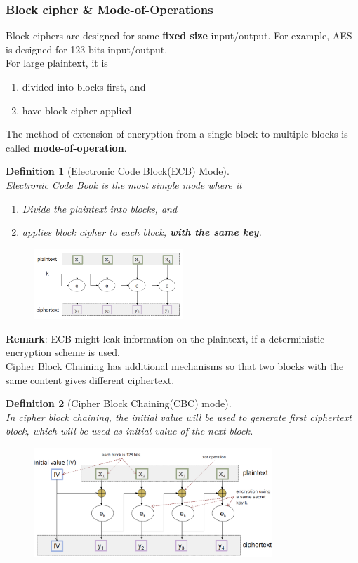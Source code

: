 \documentclass[12pt]{article}
\newtheorem{definition}{Definition}[section]
\theoremstyle{definition}
\begin{document}
\subsubsection{Block cipher \& Mode-of-Operations}
Block ciphers are designed for some \textbf{fixed size} input/output. For example, AES is designed for 123 bits input/output.\\
For large plaintext, it is 
\begin{enumerate}
\item divided into blocks first, and
\item have block cipher applied
\end{enumerate}
The method of extension of encryption from a single block to multiple blocks is called \textbf{mode-of-operation}.
\begin{definition}[Electronic Code Block(ECB) Mode]
\hfill\\\normalfont Electronic Code Book is the most simple mode where it 
\begin{enumerate}
  \item Divide the plaintext into blocks, and
  \item applies block cipher to each block, \textbf{with the same key}.
\end{enumerate}
\end{definition}
\clearpage
\begin{figure}[h]
\centering
\includegraphics[width = 0.5\textwidth]{1_1.png}
\end{figure}
\textbf{Remark}: ECB might leak information on the plaintext, if a deterministic encryption scheme is used.\\
Cipher Block Chaining has additional mechanisms so that two blocks with the same content gives different ciphertext.
\begin{definition}[Cipher Block Chaining(CBC) mode]
\hfill\\\normalfont 
In cipher block chaining, the initial value will be used to generate first ciphertext block, which will be used as initial value of the next block.
\end{definition}
\begin{figure}[h]
\centering
\includegraphics[width = 0.8\textwidth]{1_2.png}
\end{figure}
\end{document}
